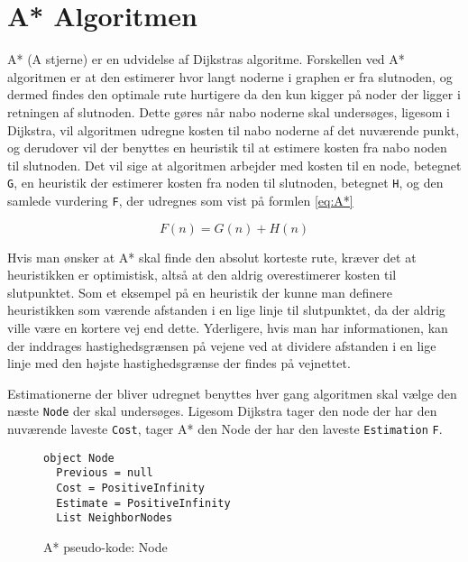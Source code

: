 \section{A* Algoritmen}\label{AStjerneTeori}
A* (A stjerne) er en udvidelse af Dijkstras algoritme. Forskellen ved A* algoritmen er at den estimerer hvor langt noderne i graphen er fra slutnoden, og dermed findes den optimale rute hurtigere da den kun kigger på noder der ligger i retningen af slutnoden. Dette gøres når nabo noderne skal undersøges, ligesom i Dijkstra, vil algoritmen udregne kosten til nabo noderne af det nuværende punkt, og derudover vil der benyttes en heuristik til at estimere kosten fra nabo noden til slutnoden. Det vil sige at algoritmen arbejder med kosten til en node, betegnet \texttt{G}, en heuristik der estimerer kosten fra noden til slutnoden, betegnet \texttt{H}, og den samlede vurdering \texttt{F}, der udregnes som vist på formlen \ref{eq:A*}

\begin{equation} \label{eq:A*}
F(n) = G(n) + H(n)
\end{equation}
\vspace{5mm}

Hvis man ønsker at A* skal finde den absolut korteste rute, kræver det at heuristikken er optimistisk, altså at den aldrig overestimerer kosten til slutpunktet. Som et eksempel på en heuristik der kunne man definere heuristikken som værende afstanden i en lige linje til slutpunktet, da der aldrig ville være en kortere vej end dette. Yderligere, hvis man har informationen, kan der inddrages hastighedsgrænsen på vejene ved at dividere afstanden i en lige linje med den højste hastighedsgrænse der findes på vejnettet.

\vspace{5mm}

Estimationerne der bliver udregnet benyttes hver gang algoritmen skal vælge den næste \texttt{Node} der skal undersøges. Ligesom Dijkstra tager den node der har den nuværende laveste \texttt{Cost}, tager A* den Node der har den laveste \texttt{Estimation} \texttt{F}.

\begin{figure}[H]
\begin{lstlisting}
object Node
  Previous = null
  Cost = PositiveInfinity
  Estimate = PositiveInfinity
  List NeighborNodes
\end{lstlisting}
\caption{A* pseudo-kode: Node}\label{AStarCodeNode}
\end{figure}


